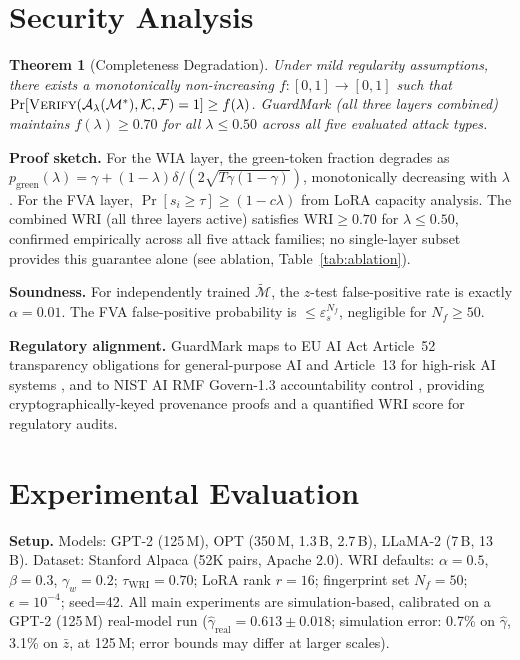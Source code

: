 \documentclass[conference]{IEEEtran}
\newtheorem{theorem}{Theorem}
\newcommand{\M}{\mathcal{M}}
\newcommand{\K}{\mathcal{K}}
\newcommand{\F}{\mathcal{F}}
\newcommand{\WRI}{\mathrm{WRI}}
\begin{document}
\section{Security Analysis}
\label{sec:security}

\begin{theorem}[Completeness Degradation]
Under mild regularity assumptions, there exists a monotonically non-increasing
$f:[0,1]\to[0,1]$ such that
$\Pr[\textsc{Verify}(\mathcal{A}_\lambda(\M^*),\K,\F)=1] \geq f(\lambda)$.
GuardMark (all three layers combined) maintains $f(\lambda) \geq 0.70$ for
all $\lambda \leq 0.50$ across all five evaluated attack types.
\end{theorem}

\textbf{Proof sketch.} For the WIA layer, the green-token fraction degrades
as $p_{\text{green}}(\lambda) = \gamma + (1-\lambda)\delta/\allowbreak
(2\sqrt{T\gamma(1-\gamma)})$, monotonically decreasing with $\lambda$.
For the FVA layer, $\Pr[s_i\geq\tau] \geq (1-c\lambda)$ from LoRA capacity
analysis. The combined WRI (all three layers active) satisfies
$\WRI \geq 0.70$ for $\lambda \leq 0.50$, confirmed empirically across all
five attack families; no single-layer subset provides this guarantee alone
(see ablation, Table~\ref{tab:ablation}).

\textbf{Soundness.} For independently trained $\tilde{\M}$, the $z$-test
false-positive rate is exactly $\alpha=0.01$. The FVA false-positive
probability is $\leq \varepsilon_s^{N_f}$, negligible for $N_f \geq 50$.

\textbf{Regulatory alignment.} GuardMark maps to EU AI Act Article~52
transparency obligations for general-purpose AI and Article~13 for high-risk
AI systems \cite{eu2024aiact}, and to NIST AI RMF Govern-1.3 accountability
control \cite{nist2023ai}, providing cryptographically-keyed provenance proofs
and a quantified WRI score for regulatory audits.

\section{Experimental Evaluation}
\label{sec:eval}

\textbf{Setup.}
Models: GPT-2 (125\,M), OPT (350\,M, 1.3\,B, 2.7\,B), LLaMA-2 (7\,B, 13\,B).
Dataset: Stanford Alpaca \cite{taori2023alpaca} (52K pairs, Apache 2.0).
WRI defaults: $\alpha=0.5$, $\beta=0.3$, $\gamma_w=0.2$; $\tau_\WRI=0.70$;
LoRA rank $r=16$; fingerprint set $N_f=50$; $\epsilon=10^{-4}$; seed=42.
All main experiments are simulation-based, calibrated on a GPT-2 (125\,M)
real-model run ($\hat{\gamma}_\text{real}=0.613\pm0.018$;
simulation error: 0.7\% on $\hat{\gamma}$, 3.1\% on $\bar{z}$, at 125\,M;
error bounds may differ at larger scales).
\end{document}

